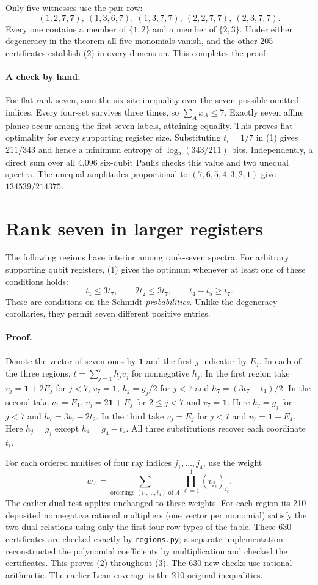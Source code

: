 \documentclass[11pt]{article}
\begin{document}
Only five witnesses use the pair row:
\[
 (1,2,7,7),\ (1,3,6,7),\ (1,3,7,7),\ (2,2,7,7),\ (2,3,7,7).
\]
Every one contains a member of $\{1,2\}$ and a member of $\{2,3\}$. Under either degeneracy in the theorem all five monomials vanish, and the other 205 certificates establish (2) in every dimension. This completes the proof.

\paragraph{A check by hand.} For flat rank seven, sum the six-site inequality over the seven possible omitted indices. Every four-set survives three times, so $\sum_A x_A\leq7$. Exactly seven affine planes occur among the first seven labels, attaining equality. This proves flat optimality for every supporting register size. Substituting $t_i=1/7$ in (1) gives $211/343$ and hence a minimum entropy of $\log_2(343/211)$ bits. Independently, a direct sum over all 4,096 six-qubit Paulis checks this value and two unequal spectra. The unequal amplitudes proportional to $(7,6,5,4,3,2,1)$ give $134539/214375$.


\section{Rank seven in larger registers}
The following regions have interior among rank-seven spectra. For arbitrary supporting qubit registers, (1) gives the optimum whenever at least one of these conditions holds:
\[
 t_1\le 3t_7,\qquad 2t_2\le3t_7,\qquad t_4-t_5\ge t_7 .
 \tag{3}
\]
These are conditions on the Schmidt \emph{probabilities}. Unlike the degeneracy corollaries, they permit seven different positive entries.

\paragraph{Proof.} Denote the vector of seven ones by $\mathbf 1$ and the first-$j$ indicator by $E_j$. In each of the three regions, $t=\sum_{j=1}^7 h_j v_j$ for nonnegative $h_j$. In the first region take $v_j=\mathbf1+2E_j$ for $j<7$, $v_7=\mathbf1$, $h_j=g_j/2$ for $j<7$ and $h_7=(3t_7-t_1)/2$. In the second take $v_1=E_1$, $v_j=2\mathbf1+E_j$ for $2\le j<7$ and $v_7=\mathbf1$. Here $h_j=g_j$ for $j<7$ and $h_7=3t_7-2t_2$. In the third take $v_j=E_j$ for $j<7$ and $v_7=\mathbf1+E_4$. Here $h_j=g_j$ except $h_4=g_4-t_7$. All three substitutions recover each coordinate $t_i$.

For each ordered multiset of four ray indices $j_1,\ldots,j_4$, use the weight
\[
 w_A=\sum_{\text{orderings }(i_1,\ldots,i_4)\text{ of }A}
              \prod_{\ell=1}^4 (v_{j_\ell})_{i_\ell}.
\]
The earlier dual test applies unchanged to these weights. For each region its 210 deposited nonnegative rational multipliers (one vector per monomial) satisfy the two dual relations using only the first four row types of the table. These 630 certificates are checked exactly by \texttt{regions.py}; a separate implementation reconstructed the polynomial coefficients by multiplication and checked the certificates. This proves (2) throughout (3). The 630 new checks use rational arithmetic. The earlier Lean coverage is the 210 original inequalities.
\end{document}
